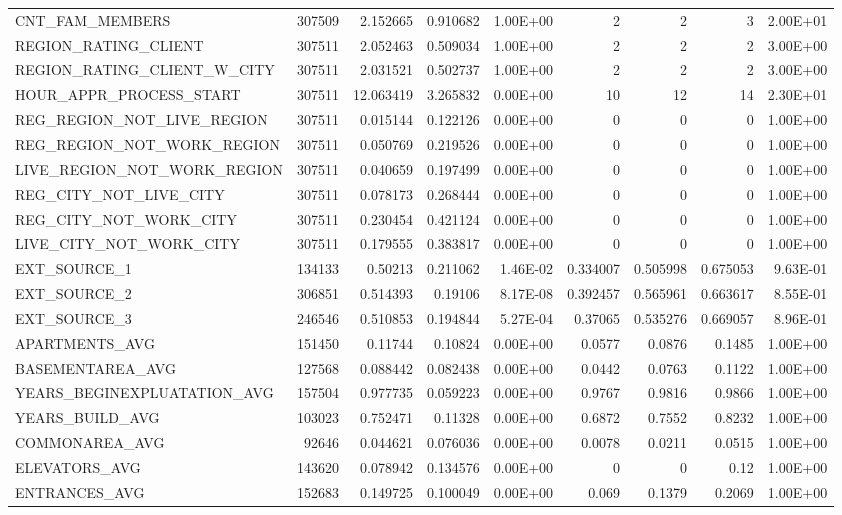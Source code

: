 \documentclass[12pt, letterpaper]{article}
\begin{document}
\begin{appendices}
{\begin{longtable}[c]{| l || r | r | r | r | r | r | r | r |}
 CNT_FAM_MEMBERS	&	307509	&	2.152665	&	0.910682	&	1.00E+00	&	2	&	2	&	3	&	2.00E+01	\\
 REGION_RATING_CLIENT	&	307511	&	2.052463	&	0.509034	&	1.00E+00	&	2	&	2	&	2	&	3.00E+00	\\
 REGION_RATING_CLIENT_W_CITY	&	307511	&	2.031521	&	0.502737	&	1.00E+00	&	2	&	2	&	2	&	3.00E+00	\\
 HOUR_APPR_PROCESS_START	&	307511	&	12.063419	&	3.265832	&	0.00E+00	&	10	&	12	&	14	&	2.30E+01	\\
 REG_REGION_NOT_LIVE_REGION	&	307511	&	0.015144	&	0.122126	&	0.00E+00	&	0	&	0	&	0	&	1.00E+00	\\
 REG_REGION_NOT_WORK_REGION	&	307511	&	0.050769	&	0.219526	&	0.00E+00	&	0	&	0	&	0	&	1.00E+00	\\
 LIVE_REGION_NOT_WORK_REGION	&	307511	&	0.040659	&	0.197499	&	0.00E+00	&	0	&	0	&	0	&	1.00E+00	\\
 REG_CITY_NOT_LIVE_CITY	&	307511	&	0.078173	&	0.268444	&	0.00E+00	&	0	&	0	&	0	&	1.00E+00	\\
 REG_CITY_NOT_WORK_CITY	&	307511	&	0.230454	&	0.421124	&	0.00E+00	&	0	&	0	&	0	&	1.00E+00	\\
 LIVE_CITY_NOT_WORK_CITY	&	307511	&	0.179555	&	0.383817	&	0.00E+00	&	0	&	0	&	0	&	1.00E+00	\\
 EXT_SOURCE_1	&	134133	&	0.50213	&	0.211062	&	1.46E-02	&	0.334007	&	0.505998	&	0.675053	&	9.63E-01	\\
 EXT_SOURCE_2	&	306851	&	0.514393	&	0.19106	&	8.17E-08	&	0.392457	&	0.565961	&	0.663617	&	8.55E-01	\\
 EXT_SOURCE_3	&	246546	&	0.510853	&	0.194844	&	5.27E-04	&	0.37065	&	0.535276	&	0.669057	&	8.96E-01	\\
 APARTMENTS_AVG	&	151450	&	0.11744	&	0.10824	&	0.00E+00	&	0.0577	&	0.0876	&	0.1485	&	1.00E+00	\\
 BASEMENTAREA_AVG	&	127568	&	0.088442	&	0.082438	&	0.00E+00	&	0.0442	&	0.0763	&	0.1122	&	1.00E+00	\\
 YEARS_BEGINEXPLUATATION_AVG	&	157504	&	0.977735	&	0.059223	&	0.00E+00	&	0.9767	&	0.9816	&	0.9866	&	1.00E+00	\\
 YEARS_BUILD_AVG	&	103023	&	0.752471	&	0.11328	&	0.00E+00	&	0.6872	&	0.7552	&	0.8232	&	1.00E+00	\\
 COMMONAREA_AVG	&	92646	&	0.044621	&	0.076036	&	0.00E+00	&	0.0078	&	0.0211	&	0.0515	&	1.00E+00	\\
 ELEVATORS_AVG	&	143620	&	0.078942	&	0.134576	&	0.00E+00	&	0	&	0	&	0.12	&	1.00E+00	\\
 ENTRANCES_AVG	&	152683	&	0.149725	&	0.100049	&	0.00E+00	&	0.069	&	0.1379	&	0.2069	&	1.00E+00	\\

\end{longtable}}
\end{appendices}
\end{document}
